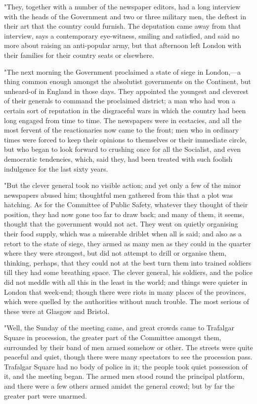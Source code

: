 "They, together with a number of the newspaper editors, had a long
interview with the heads of the Government and two or three military
men, the deftest in their art that the country could furnish. The
deputation came away from that interview, says a contemporary
eye-witness, smiling and satisfied, and said no more about raising an
anti-popular army, but that afternoon left London with their families
for their country seats or elsewhere.

"The next morning the Government proclaimed a state of siege in
London,---a thing common enough amongst the absolutist governments on
the Continent, but unheard-of in England in those days. They appointed
the youngest and cleverest of their generals to command the proclaimed
district; a man who had won a certain sort of reputation in the
disgraceful wars in which the country had been long engaged from time to
time. The newspapers were in ecstacies, and all the most fervent of the
reactionaries now came to the front; men who in ordinary times were
forced to keep their opinions to themselves or their immediate circle,
but who began to look forward to crushing once for all the Socialist,
and even democratic tendencies, which, said they, had been treated with
such foolish indulgence for the last sixty years.

"But the clever general took no visible action; and yet only a few of
the minor newspapers abused him; thoughtful men gathered from this that
a plot was hatching. As for the Committee of Public Safety, whatever
they thought of their position, they had now gone too far to draw back;
and many of them, it seems, thought that the government would not act.
They went on quietly organising their food supply, which was a miserable
driblet when all is said; and also as a retort to the state of siege,
they armed as many men as they could in the quarter where they were
strongest, but did not attempt to drill or organise them, thinking,
perhaps, that they could not at the best turn them into trained soldiers
till they had some breathing space. The clever general, his soldiers,
and the police did not meddle with all this in the least in the world;
and things were quieter in London that week-end; though there were riots
in many places of the provinces, which were quelled by the authorities
without much trouble. The most serious of these were at Glasgow and
Bristol.

"Well, the Sunday of the meeting came, and great crowds came to
Trafalgar Square in procession, the greater part of the Committee
amongst them, surrounded by their band of men armed somehow or other.
The streets were quite peaceful and quiet, though there were many
spectators to see the procession pass. Trafalgar Square had no body of
police in it; the people took quiet possession of it, and the meeting
began. The armed men stood round the principal platform, and there were
a few others armed amidst the general crowd; but by far the greater part
were unarmed.


